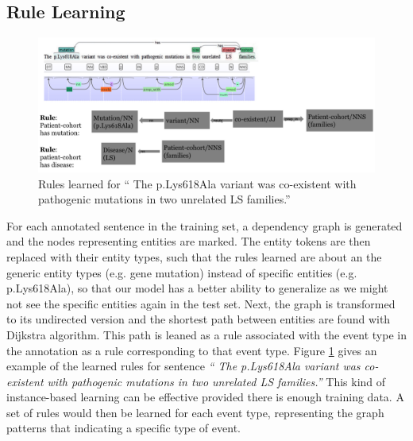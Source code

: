 \subsection{Rule Learning}
	\begin{figure}[h]
		\centering
		\includegraphics[width=\textwidth]{Rule}
		\caption{Rules learned for `` The p.Lys618Ala variant was co-existent with pathogenic mutations in two unrelated LS families.''}
		\label{fig:Rule}   
	\end{figure}
For each annotated sentence in the training set, a dependency graph is generated and the nodes representing entities are marked. The entity tokens are then replaced with their entity types, such that the rules learned are about an the generic entity types (e.g. gene mutation) instead of specific entities (e.g. p.Lys618Ala), so that our model has a better ability to generalize as we might not see the specific entities again in the test set. Next, the graph is transformed to its undirected version and the shortest path between entities are found with Dijkstra algorithm. This path is leaned as a rule associated with the event type in the annotation as a rule corresponding to that event type. Figure \ref{fig:Rule} gives an example of the learned rules for sentence \emph{`` The p.Lys618Ala variant was co-existent with pathogenic mutations in two unrelated LS families.''} This kind of instance-based learning can be effective provided there is enough training data\cite{alpaydin2014introduction}. A set of rules would then be learned for each event type, representing the graph patterns that indicating a specific type of event. 

